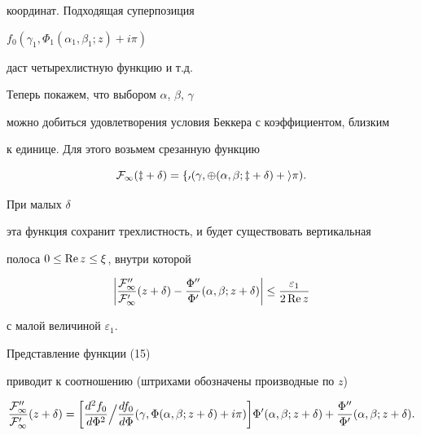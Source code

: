 \begin{pf}
координат. Подходящая суперпозиция 


$f_0(\gamma_1,\Phi_1(\alpha_1,\beta_1;z)+i\pi)$ 


даст четырехлистную функцию и т.д. 


 


Теперь покажем, что выбором $\alpha$, $\beta$, $\gamma$ 


можно добиться удовлетворения условия Беккера с коэффициентом, близким 


к единице. Для этого возьмем срезанную функцию 


\begin{equation} 


\cal F_1(z+\delta)=f_0(\gamma,\Phi(\alpha,\beta;z+\delta) 


+i\pi).


\end{equation} 


При малых $\delta$ 


эта функция сохранит трехлистность, и будет существовать вертикальная 


полоса $0\le\operatorname{Re} z\le\xi$, внутри которой 


\begin{equation} 


\bigg|\frac{\cal F''_1}{\cal F'_1}(z+\delta)- 


\frac{\Phi''}{\Phi'}(\alpha,\beta;z+\delta)\bigg|\le 


\frac{\varepsilon_1}{2\re z} 


\end{equation} 


с малой величиной $\varepsilon_1$.


 


Представление функции (15) 


приводит к соотношению (штрихами обозначены производные по $z$) 


\begin{equation} 


\frac{\cal F''_1}{\cal F'_1}(z+\delta)=\bigg[ 


\frac{d^2f_0}{d\Phi^2}\Big/\frac{df_0}{d\Phi} 


(\gamma,\Phi(\alpha,\beta;z+\delta)+i\pi)\bigg] 


\Phi'(\alpha,\beta;z+\delta)+\frac{\Phi''}{\Phi'} 


(\alpha,\beta;z+\delta). 


\end{equation} 



\end{pf}

